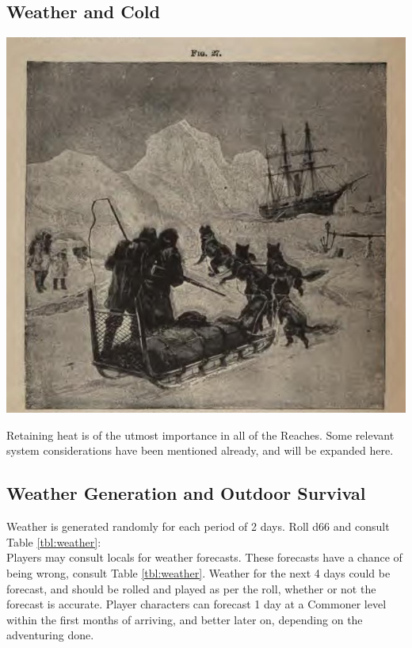 \documentclass[notitlepage]{article}
\begin{document}
\begin{multicols}{2}
\section{Weather and Cold}

{\centering \includegraphics[width=\columnwidth]{arctic-sledders}
}

Retaining heat is of the utmost importance in all of the Reaches.
Some relevant system considerations have been mentioned already, and will be expanded here. \\

\subsection*{Weather Generation and Outdoor Survival}
\label{sec:weather-outdoor}

Weather is generated randomly for each period of 2 days. Roll d66 and consult Table \ref{tbl:weather}: \\

Players may consult locals for weather forecasts.
These forecasts have a chance of being wrong, consult Table \ref{tbl:weather}.
Weather for the next 4 days could be forecast, and should be rolled and played as per the roll, whether or not the forecast is accurate.
Player characters can forecast 1 day at a Commoner level within the first months of arriving, and better later on, depending on the adventuring done. \\


\end{multicols}
\end{document}
